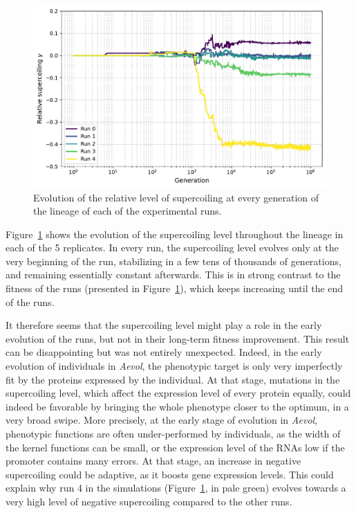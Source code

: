 \begin{figure}[H]
  \includegraphics[width=\textwidth]{aevol/images/supercoiling_all.pdf}
  \caption[Evolution of the supercoiling level of the experimental runs in \emph{Aevol}]{Evolution of the relative level of supercoiling at every generation of the lineage of each of the experimental runs.}
  \label{fig:aevol:sc}
\end{figure}

Figure~\ref{fig:aevol:sc} shows the evolution of the supercoiling level throughout the lineage in each of the 5 replicates.
In every run, the supercoiling level evolves only at the very beginning of the run, stabilizing in a few tens of thousands of generations, and remaining essentially constant afterwards.
This is in strong contrast to the fitness of the runs (presented in Figure~\ref{fig:aevol:sc}), which keeps increasing until the end of the runs.

It therefore seems that the supercoiling level might play a role in the early evolution of the runs, but not in their long-term fitness improvement.
This result can be disappointing but was not entirely unexpected.
Indeed, in the early evolution of individuals in \emph{Aevol}, the phenotypic target is only very imperfectly fit by the proteins expressed by the individual.
At that stage, mutations in the supercoiling level, which affect the expression level of every protein equally, could indeed be favorable by bringing the whole phenotype closer to the optimum, in a very broad swipe.
More precisely, at the early stage of evolution in \emph{Aevol}, phenotypic functions are often under-performed by individuals, as the width of the kernel functions can be small, or the expression level of the RNAs low if the promoter contains many errors.
At that stage, an increase in negative supercoiling could be adaptive, as it boosts gene expression levels.
This could explain why run 4 in the simulations (Figure~\ref{fig:aevol:sc}, in pale green) evolves towards a very high level of negative supercoiling compared to the other runs.

